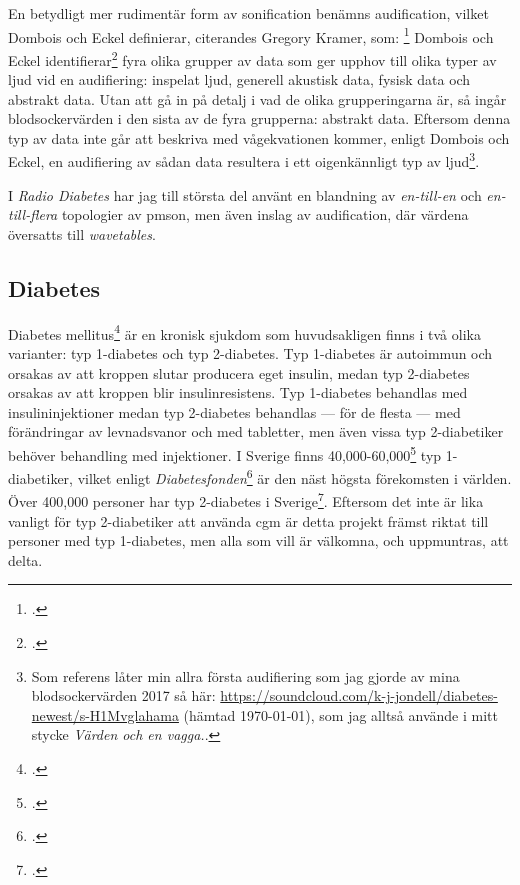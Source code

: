 \documentclass[11pt, a4paper]{article} %
\begin{document}
En betydligt mer rudimentär form av \gls{sonification} benämns \gls{audification}, vilket Dombois och Eckel definierar, citerandes Gregory Kramer, som: \footcite[301]{hermann_audification_2011} Dombois och Eckel identifierar\footcite[302]{hermann_audification_2011} fyra olika grupper av data som ger upphov till olika typer av ljud vid en audifiering: inspelat ljud, generell akustisk data, fysisk data och abstrakt data. Utan att gå in på detalj i vad de olika grupperingarna är, så ingår blodsockervärden i den sista av de fyra grupperna: abstrakt data. Eftersom denna typ av data inte går att beskriva med vågekvationen kommer, enligt Dombois och Eckel, en audifiering av sådan data resultera i ett oigenkännligt typ av ljud\footnote{Som referens låter min allra första audifiering som jag gjorde av mina blodsockervärden 2017 så här: \url{https://soundcloud.com/k-j-jondell/diabetes-newest/s-H1Mvglahama} (hämtad \today), som jag alltså använde i mitt stycke \emph{Värden och en vagga.}.}. 

I \emph{Radio Diabetes} har jag till största del använt en blandning av \emph{en-till-en} och \emph{en-till-flera} topologier av \gls{pmson}, men även inslag av \gls{audification}, där värdena översatts till \emph{wavetables}. 

\subsection*{Diabetes}

Diabetes mellitus\footcite{noauthor_lar_nodate} är en kronisk sjukdom som huvudsakligen finns i två olika varianter: typ 1-diabetes och typ 2-diabetes. Typ 1-diabetes är autoimmun och orsakas av att kroppen slutar producera eget insulin, medan typ 2-diabetes orsakas av att kroppen blir insulinresistens. Typ 1-diabetes behandlas med insulininjektioner medan typ 2-diabetes behandlas --- för de flesta --- med förändringar av levnadsvanor och med tabletter, men även vissa typ 2-diabetiker behöver behandling med injektioner. I Sverige finns 40,000-60,000\footcite[283]{arvidson_det_2016} typ 1-diabetiker, vilket enligt \emph{Diabetesfonden}\footcite{noauthor_diabetes_nodate} är den näst högsta förekomsten i världen. Över 400,000 personer har typ 2-diabetes i Sverige\footcite{noauthor_lar_nodate}. Eftersom det inte är lika vanligt för typ 2-diabetiker att använda \gls{cgm} är detta projekt främst riktat till personer med typ 1-diabetes, men alla som vill är välkomna, och uppmuntras, att delta.
\end{document}
